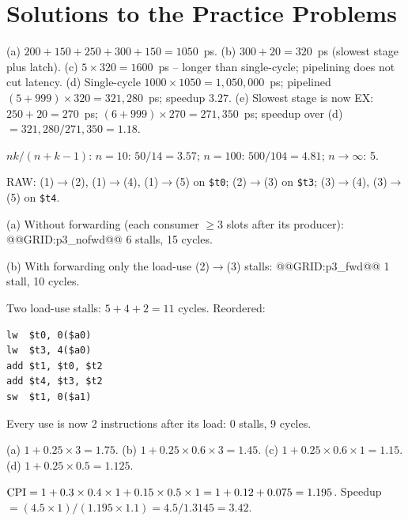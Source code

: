 \documentclass[11pt]{article}
\begin{document}
\section{Solutions to the Practice Problems}

\begin{solution}[\ref{p:clock}]
(a) $200+150+250+300+150 = 1050$~ps.
(b) $300+20 = 320$~ps (slowest stage plus latch).
(c) $5\times320 = 1600$~ps -- longer than single-cycle; pipelining does not
cut latency.
(d) Single-cycle $1000\times1050 = 1{,}050{,}000$~ps; pipelined
$(5+999)\times320 = 321{,}280$~ps; speedup $3.27$.
(e) Slowest stage is now EX: $250+20=270$~ps; $(6+999)\times270 =
271{,}350$~ps; speedup over (d) $=321{,}280/271{,}350 = 1.18$.
\end{solution}

\begin{solution}[\ref{p:ideal}]
$nk/(n+k-1)$: $n=10$: $50/14 = 3.57$; $n=100$: $500/104 = 4.81$;
$n\to\infty$: 5.
\end{solution}

\begin{solution}[\ref{p:stalls}]
RAW: (1)$\to$(2), (1)$\to$(4), (1)$\to$(5) on \texttt{\$t0};
(2)$\to$(3) on \texttt{\$t3}; (3)$\to$(4), (3)$\to$(5) on \texttt{\$t4}.

(a) Without forwarding (each consumer $\ge3$ slots after its producer):
@@GRID:p3_nofwd@@
6 stalls, 15 cycles.

(b) With forwarding only the load-use (2)$\to$(3) stalls:
@@GRID:p3_fwd@@
1 stall, 10 cycles.
\end{solution}

\begin{solution}[\ref{p:sched}]
Two load-use stalls: $5+4+2 = 11$ cycles. Reordered:
\begin{lstlisting}
lw  $t0, 0($a0)
lw  $t3, 4($a0)
add $t1, $t0, $t2
add $t4, $t3, $t2
sw  $t1, 0($a1)
\end{lstlisting}
Every use is now 2 instructions after its load: 0 stalls, 9 cycles.
\end{solution}

\begin{solution}[\ref{p:branch}]
(a) $1+0.25\times3 = 1.75$.
(b) $1+0.25\times0.6\times3 = 1.45$.
(c) $1+0.25\times0.6\times1 = 1.15$.
(d) $1+0.25\times0.5 = 1.125$.
\end{solution}

\begin{solution}[\ref{p:mix}]
$\mathrm{CPI} = 1+0.3\times0.4\times1+0.15\times0.5\times1 = 1+0.12+0.075 = 1.195$.
Speedup $=(4.5\times1)/(1.195\times1.1) = 4.5/1.3145 = 3.42$.
\end{solution}
\end{document}
